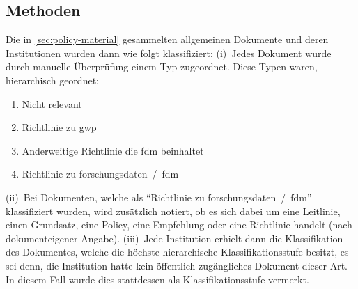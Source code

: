 \subsection{Methoden}\label{sec:policy-methods}
Die in \cref{sec:policy-material} gesammelten allgemeinen Dokumente und deren Institutionen wurden dann wie folgt klassifiziert:
(i)~Jedes Dokument wurde durch manuelle Überprüfung einem Typ zugeordnet.
Diese Typen waren, hierarchisch geordnet: 
\begin{enumerate}
    \item Nicht relevant
    \item Richtlinie zu \gls{gwp}
    \item Anderweitige Richtlinie die \gls{fdm} beinhaltet
    \item Richtlinie zu \gls{forschungsdaten}~/~\gls{fdm}
\end{enumerate}    
(ii)~Bei Dokumenten, welche als \enquote{Richtlinie zu \gls{forschungsdaten}~/~\gls{fdm}} klassifiziert wurden, wird zusätzlich notiert, ob es sich dabei um eine Leitlinie, einen Grundsatz, eine Policy, eine Empfehlung oder eine Richtlinie handelt (nach dokumenteigener Angabe).
(iii)~Jede Institution erhielt dann die Klassifikation des Dokumentes, welche die höchste hierarchische Klassifikationsstufe besitzt, es sei denn, die Institution hatte kein öffentlich zugängliches Dokument dieser Art.
In diesem Fall wurde dies stattdessen als Klassifikationsstufe vermerkt.

